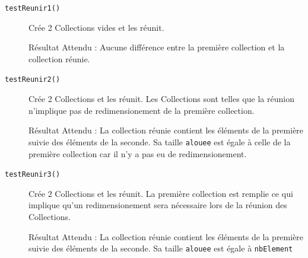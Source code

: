 \documentclass[11pt]{article}
\begin{document}
\begin{description}
	\item[\texttt{testReunir1()}] Crée 2 Collections vides et les réunit.
	
	Résultat Attendu : Aucune différence entre la première collection et la collection réunie.
	
	\item[\texttt{testReunir2()}] Crée 2 Collections et les réunit. Les Collections sont telles que la réunion n'implique pas de redimensionement de la première collection.
	
	Résultat Attendu : La collection réunie contient les éléments de la première suivie des éléments de la seconde. Sa taille \texttt{alouee} est égale à celle de la première collection car il n'y a pas eu de redimensionement.
	
	\item[\texttt{testReunir3()}] Crée 2 Collections et les réunit. La première collection est remplie ce qui implique qu'un redimensionement sera nécessaire lors de la réunion des Collections.
	
	Résultat Attendu : La collection réunie contient les éléments de la première suivie des éléments de la seconde. Sa taille \texttt{alouee} est égale à \texttt{nbElement}
 
\end{description} 
\end{document}
